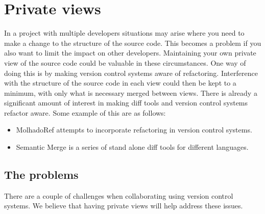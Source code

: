 
\chapter{Private views}

In a project with multiple developers situations may arise where you need to make a change to the structure of the source code. 
This becomes a problem if you also want to limit the impact on other developers.  
Maintaining your own private view of the source code could be valuable in these circumstances. 
One way of doing this is by making version control systems aware of refactoring. 
Interference with the structure of the source code in each view could then be kept to a minimum, with only what is necessary merged between views.
There is already a significant amount of interest in making diff tools and version control systems refactor aware. 
Some example of this are as follows:

\begin{itemize}
  \item MolhadoRef \cite{DannyDig} \cite{Dig2008} attempts to incorporate refactoring in version control systems.
  \item Semantic Merge \cite{CODICESOFTWARE} is a series of stand alone diff tools for different languages. 
\end{itemize}

\section{The problems}
There are a couple of challenges when collaborating using version control systems. We believe that having private views will help address these issues.  

